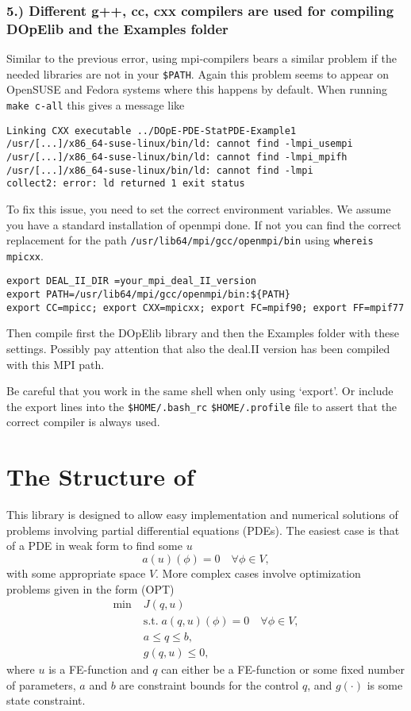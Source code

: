 \subsection*{5.) Different g++, cc, cxx compilers are used for compiling
  DOpElib and the Examples folder}

Similar to the previous error, using mpi-compilers bears a similar
problem if the needed libraries are not in your \texttt{\${PATH}}.
Again this problem seems to appear on OpenSUSE and Fedora systems
where this happens by default.
When running \texttt{make c-all} this gives a message like 
{\small
\begin{lstlisting}
Linking CXX executable ../DOpE-PDE-StatPDE-Example1
/usr/[...]/x86_64-suse-linux/bin/ld: cannot find -lmpi_usempi
/usr/[...]/x86_64-suse-linux/bin/ld: cannot find -lmpi_mpifh
/usr/[...]/x86_64-suse-linux/bin/ld: cannot find -lmpi
collect2: error: ld returned 1 exit status
\end{lstlisting}
}

To fix this issue, you need to set the correct environment variables.
We assume you have a standard installation of openmpi done. If not you
can find the correct replacement for the path
\texttt{/usr/lib64/mpi/gcc/openmpi/bin} 
using \texttt{whereis mpicxx}.
{\small
\begin{lstlisting}
export DEAL_II_DIR =your_mpi_deal_II_version 
export PATH=/usr/lib64/mpi/gcc/openmpi/bin:${PATH}  
export CC=mpicc; export CXX=mpicxx; export FC=mpif90; export FF=mpif77
\end{lstlisting}}
Then compile first the DOpElib library and then the Examples folder with these 
settings. Possibly pay attention that also the deal.II version has been
compiled 
with this MPI path.

\begin{remark}
Be careful that you work in the same shell when only using `export'. 
Or include the export lines into the \texttt{\${HOME}/.bash\_rc} 
\texttt{\${HOME}/.profile}
file to assert that the correct
compiler is always used.
\end{remark}

\chapter{The Structure of \dope{}}
This library is designed to allow easy implementation and numerical solutions 
of problems involving partial differential equations (PDEs). The easiest case 
is that of a PDE in weak form to find some $u$
\[
a(u)(\phi) = 0 \quad \forall \phi \in V,
\]
with some appropriate space $V$.
More complex cases involve optimization problems given in the form (OPT)
\begin{align*}
\min\;&J(q,u) \\
  &\text{s.t.}\; a(q,u)(\phi) = 0 \quad \forall \phi\in V,\\
  &a \le q \le b,\\
  &g(q,u) \le 0,  
\end{align*}
where $u$ is a FE-function and $q$ can either be a FE-function or some 
fixed number of parameters, $a$ and $b$ are constraint bounds for the control $q$,
and $g(\cdot)$ is some state constraint.


